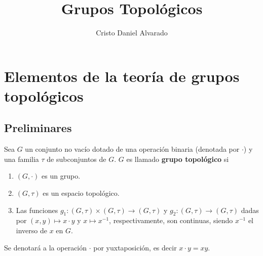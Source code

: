 \documentclass[12pt]{report}
\theoremstyle{largebreak}
\newcommand{\cf}[3]{\ensuremath{#1:#2\rightarrow#3}}
\begin{document}
    \setlength{\parskip}{5pt} %
    \setlength{\parindent}{12pt} %
    \title{Grupos Topológicos}
    \author{Cristo Daniel Alvarado}
    \maketitle

    \tableofcontents %

    
    \chapter{Elementos de la teoría de grupos topológicos}
    
    \section{Preliminares}

    \begin{mydef}
        Sea $G$ un conjunto no vacío dotado de una operación binaria (denotada por $\cdot$) y una familia $\tau$ de subconjuntos de $G$. $G$ es llamado \textbf{grupo topológico} si
        \begin{enumerate}
            \item $(G,\cdot)$ es un grupo.
            \item $(G,\tau)$ es un espacio topológico.
            \item Las funciones $\cf{g_1}{(G,\tau)\times (G,\tau)}{(G,\tau)}$ y $\cf{g_2}{(G,\tau)}{(G,\tau)}$ dadas por $(x,y)\mapsto x\cdot y$ y $x\mapsto x^{-1}$, respectivamente, son continuas, siendo $x^{-1}$ el inverso de $x$ en $G$.
        \end{enumerate}
    \end{mydef}

    Se denotará a la operación $\cdot$ por yuxtaposición, es decir $x\cdot y = xy$.
\end{document}
